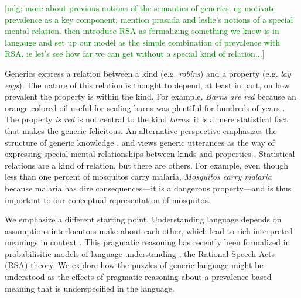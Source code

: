 \documentclass[10pt,letterpaper]{article}
\newcommand{\ndg}[1]{\textcolor{Green}{[ndg: #1]}}
\begin{document}
\ndg{more about previous notions of the semantics of generics. eg motivate prevalence as a key component, mention prasada and leslie's notions of a special mental relation. then introduce RSA as formalizing something we know is in langauge and set up our model as the simple combination of prevalence with RSA. ie let's see how far we can get without a special kind of relation...}
 
Generics express a relation between a kind (e.g. \emph{robins}) and a property (e.g. \emph{lay eggs}). 
The nature of this relation is thought to depend, at least in part, on how prevalent the property is within the kind. 
For example, \emph{Barns are red} because an orange-colored oil useful for sealing barns was plentiful for hundreds of years \cite{barns}. 
The property \emph{is red} is not central to the kind \emph{barns}; it is a mere statistical fact that makes the generic felicitous.
An alternative perspective emphasizes the structure of generic knowledge \cite{Prasada2000}, and views generic utterances as the way of expressing special mental relationships between kinds and properties \cite{Leslie2008, Prasada2012}. 
Statistical relations are a kind of relation, but there are others. 
For example, even though less than one percent of mosquitos carry malaria, \emph{Mosquitos carry malaria} because malaria has dire consequences---it is a dangerous property---and is thus important to our conceptual representation of mosquitos.

We emphasize a different starting point. 
Understanding language depends on assumptions interlocutors make about each other, which lead to rich interpreted meanings in context \cite{Clark1996, Grice1975, Levinson2000}. 
This pragmatic reasoning has recently been formalized in probabilisitic models of language understanding \cite{Frank2012, Goodman2013, Franke2009}, the Rational Speech Acts (RSA) theory. 
We explore how the puzzles of generic language might be understood as the effects of pragmatic reasoning about a prevalence-based meaning that is underspecified in the language.
\end{document}
